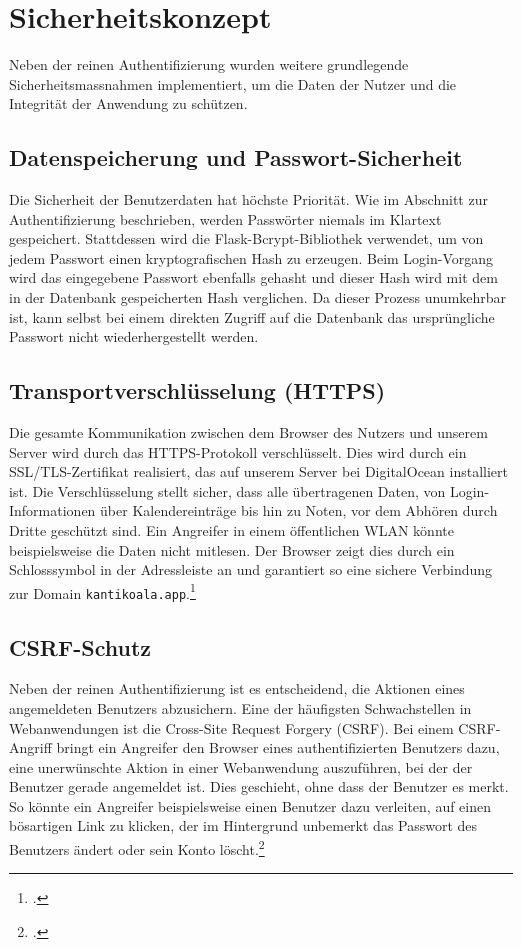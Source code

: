 \documentclass[12pt,a4paper]{report}
\begin{document}
\section{Sicherheitskonzept}
Neben der reinen Authentifizierung wurden weitere grundlegende Sicherheitsmassnahmen implementiert, um die Daten der Nutzer und die Integrität der Anwendung zu schützen.

\subsection{Datenspeicherung und Passwort-Sicherheit}
Die Sicherheit der Benutzerdaten hat höchste Priorität. Wie im Abschnitt zur Authentifizierung beschrieben, werden Passwörter niemals im Klartext gespeichert. Stattdessen wird die Flask-Bcrypt-Bibliothek verwendet, um von jedem Passwort einen kryptografischen Hash zu erzeugen. Beim Login-Vorgang wird das eingegebene Passwort ebenfalls gehasht und dieser Hash wird mit dem in der Datenbank gespeicherten Hash verglichen. Da dieser Prozess unumkehrbar ist, kann selbst bei einem direkten Zugriff auf die Datenbank das ursprüngliche Passwort nicht wiederhergestellt werden.

\subsection{Transportverschlüsselung (HTTPS)}
Die gesamte Kommunikation zwischen dem Browser des Nutzers und unserem Server wird durch das HTTPS-Protokoll verschlüsselt. Dies wird durch ein SSL/TLS-Zertifikat realisiert, das auf unserem Server bei DigitalOcean installiert ist. Die Verschlüsselung stellt sicher, dass alle übertragenen Daten, von Login-Informationen über Kalendereinträge bis hin zu Noten, vor dem Abhören durch Dritte geschützt sind. Ein Angreifer in einem öffentlichen WLAN könnte beispielsweise die Daten nicht mitlesen. Der Browser zeigt dies durch ein Schlosssymbol in der Adressleiste an und garantiert so eine sichere Verbindung zur Domain \texttt{kantikoala.app}.\footcite{cloudflare_https}

\subsection{CSRF-Schutz}
Neben der reinen Authentifizierung ist es entscheidend, die Aktionen eines angemeldeten Benutzers abzusichern. Eine der häufigsten Schwachstellen in Webanwendungen ist die Cross-Site Request Forgery (CSRF). Bei einem CSRF-Angriff bringt ein Angreifer den Browser eines authentifizierten Benutzers dazu, eine unerwünschte Aktion in einer Webanwendung auszuführen, bei der der Benutzer gerade angemeldet ist. Dies geschieht, ohne dass der Benutzer es merkt. So könnte ein Angreifer beispielsweise einen Benutzer dazu verleiten, auf einen bösartigen Link zu klicken, der im Hintergrund unbemerkt das Passwort des Benutzers ändert oder sein Konto löscht.\footcite{TestDriven_CSRF}
\end{document}
